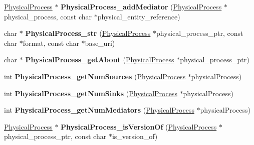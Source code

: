 \begin{DoxyCompactItemize}
\item 
\mbox{\label{namespaceomexmeta_a1554e14b6f4401341fa0e7f23f6d4c90}} 
\hyperlink{classomexmeta_1_1PhysicalProcess}{Physical\+Process} $\ast$ {\bfseries Physical\+Process\+\_\+add\+Mediator} (\hyperlink{classomexmeta_1_1PhysicalProcess}{Physical\+Process} $\ast$physical\+\_\+process, const char $\ast$physical\+\_\+entity\+\_\+reference)
\item 
\mbox{\label{namespaceomexmeta_ae79e87b864da4b401488f522bb6734e7}} 
char $\ast$ {\bfseries Physical\+Process\+\_\+str} (\hyperlink{classomexmeta_1_1PhysicalProcess}{Physical\+Process} $\ast$physical\+\_\+process\+\_\+ptr, const char $\ast$format, const char $\ast$base\+\_\+uri)
\item 
\mbox{\label{namespaceomexmeta_a738e9d39898919fb01bd9a7ed5af3687}} 
char $\ast$ {\bfseries Physical\+Process\+\_\+get\+About} (\hyperlink{classomexmeta_1_1PhysicalProcess}{Physical\+Process} $\ast$physical\+\_\+process\+\_\+ptr)
\item 
\mbox{\label{namespaceomexmeta_aa7371fdf91f4c6c120e4559b23ad3585}} 
int {\bfseries Physical\+Process\+\_\+get\+Num\+Sources} (\hyperlink{classomexmeta_1_1PhysicalProcess}{Physical\+Process} $\ast$physical\+Process)
\item 
\mbox{\label{namespaceomexmeta_aaf4162aa78c2c7f73449705a3e0fc951}} 
int {\bfseries Physical\+Process\+\_\+get\+Num\+Sinks} (\hyperlink{classomexmeta_1_1PhysicalProcess}{Physical\+Process} $\ast$physical\+Process)
\item 
\mbox{\label{namespaceomexmeta_a7ad65f0ec2f5c8433ebc126c75779520}} 
int {\bfseries Physical\+Process\+\_\+get\+Num\+Mediators} (\hyperlink{classomexmeta_1_1PhysicalProcess}{Physical\+Process} $\ast$physical\+Process)
\item 
\mbox{\label{namespaceomexmeta_af73229fd4219d7dfa0fa3876ac982ad9}} 
\hyperlink{classomexmeta_1_1PhysicalProcess}{Physical\+Process} $\ast$ {\bfseries Physical\+Process\+\_\+is\+Version\+Of} (\hyperlink{classomexmeta_1_1PhysicalProcess}{Physical\+Process} $\ast$physical\+\_\+process\+\_\+ptr, const char $\ast$is\+\_\+version\+\_\+of)

\end{DoxyCompactItemize}
